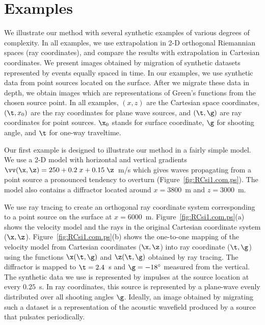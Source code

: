 \section{Examples}
We illustrate our method with several synthetic examples of
various degrees of complexity. In all examples, we use 
extrapolation in {2-D} orthogonal Riemannian spaces
(ray coordinates), and compare the results with extrapolation
in Cartesian coordinates.
We present images obtained by migration of synthetic datasets
represented by events equally spaced in time.
In our examples, we use synthetic data from point 
sources located on the surface. After we migrate these data 
in depth, we obtain images which are representations of 
Green's functions from the chosen source point.
In all examples, $(x,z)$ are the Cartesian
space coordinates, $(\t,x_0)$ are the ray coordinates
for plane wave sources, and $(\t,\g)$ are ray
coordinates for point sources.
$\x_0$ stands for surface coordinate, 
$\g$ for shooting angle, and
$\t$ for one-way traveltime.
\par
Our first example is designed to illustrate our method 
in a fairly simple model. We use a {2-D} model with 
horizontal and vertical gradients
$\vv(\x,\z)=250+0.2\;x+0.15\;\z$~m/s which gives waves
propagating from a point source a pronounced 
tendency to overturn 
(Figure~\ref{fig:RCsi1.com.ps}).
The model also contains a diffractor located
around $x=3800$~m and $z=3000$~m.
\par
We use ray tracing to create an orthogonal 
ray coordinate system corresponding to a point 
source on the surface at $x=6000$~m.
Figure~\ref{fig:RCsi1.com.ps}(a) shows the velocity
model and the rays in the original Cartesian 
coordinate system ($\x,\z$).
Figure~\ref{fig:RCsi1.com.ps}(b) shows the one-to-one
mapping of the velocity model from 
Cartesian coordinates ($\x,\z$) into ray coordinate ($\t,\g$)
using the functions 
$\x(\t,\g)$ and 
$\z(\t,\g)$ obtained by ray tracing.
The diffractor is mapped to $\t=2.4$~s and 
$\g=-18^\circ$ measured from the vertical.
The synthetic data we use is represented by
impulses at the source location at every $0.25$~s.
In ray coordinates, this source is represented by a 
plane-wave evenly distributed over all 
shooting angles $\g$.
Ideally, an image obtained by migrating such a dataset
is a representation of the acoustic wavefield 
produced by a source that pulsates periodically.
